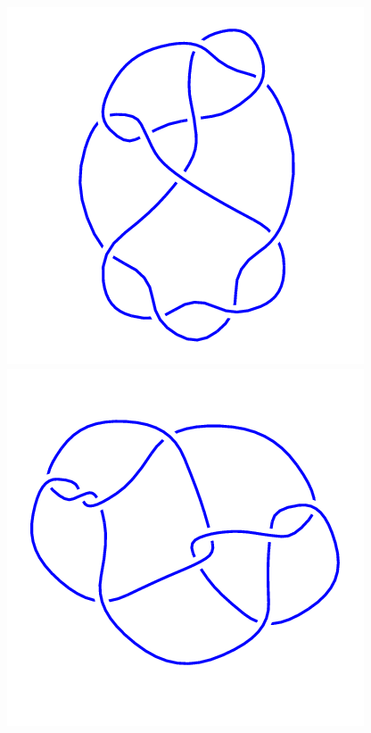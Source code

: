 \begin{figure}[H]
    \begin{minipage}[b]{.18\linewidth}
        \centering
        \includegraphics[width=\linewidth]{../data/10_127.png}
    \end{minipage}
    \begin{minipage}[b]{.18\linewidth}
        \centering
        \includegraphics[width=\linewidth]{../data/10_128.png}

\end{minipage}
\end{figure}
